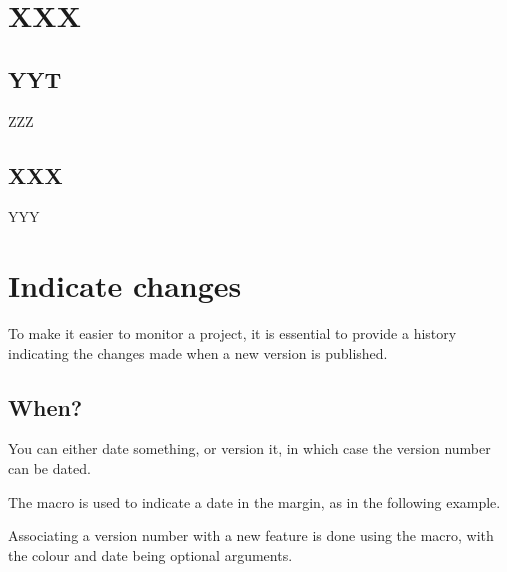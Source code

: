 \section{XXX}

\subsection{YYT}

ZZZ


\subsection{XXX}

YYY


\section{Indicate changes}
\label{tutodoc-changes}

To make it easier to monitor a project, it is essential to provide a history indicating the changes made when a new version is published.



\subsection{When?}
\label{tutodoc-changes-when}

You can either date something, or version it, in which case the version number can be dated.




\begin{tdocexa}
    The  macro is used to indicate a date in the margin, as in the following example.


\end{tdocexa}




\begin{tdocexa}
    Associating a version number with a new feature is done using the  macro, with the colour and date being optional arguments.


\end{tdocexa}


